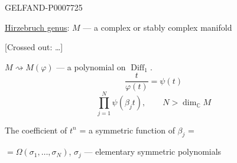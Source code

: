 \begin{GelfandAdjacentEvidence}{GELFAND-P000772}{5}


\underline{Hirzebruch genus}: \(M\) --- a complex or stably complex manifold

[Crossed out: …]
\end{GelfandAdjacentEvidence}

\(M\rightsquigarrow M(\varphi)\) --- a polynomial on \(\operatorname{Diff}_1\).
\[
\frac{t}{\varphi(t)}=\psi(t)
\]
\[
\prod_{j=1}^{N}\psi(\beta_jt),\qquad N>\dim_{\mathbb C}M
\]

The coefficient of \(t^n\) = a symmetric function of \(\beta_j\) =

\(=\Omega(\sigma_1,\ldots,\sigma_N)\), \(\sigma_j\) --- elementary symmetric polynomials


